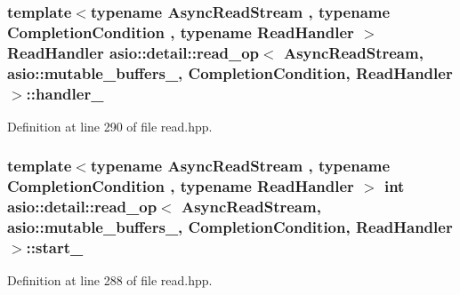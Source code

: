 \subsubsection[{handler\+\_\+}]{\setlength{\rightskip}{0pt plus 5cm}template$<$typename Async\+Read\+Stream , typename Completion\+Condition , typename Read\+Handler $>$ Read\+Handler {\bf asio\+::detail\+::read\+\_\+op}$<$ Async\+Read\+Stream, {\bf asio\+::mutable\+\_\+buffers\+\_},                           Completion\+Condition, Read\+Handler $>$\+::handler\+\_\+}\label{classasio_1_1detail_1_1read__op_3_01_async_read_stream_00_01asio_1_1mutable__buffers__1_00_01_018ff00a3c2aa5481d9cf38a1ea7821a38_ade92732080a200e0a0b16893e6d7c218}


Definition at line 290 of file read.\+hpp.

\hypertarget{classasio_1_1detail_1_1read__op_3_01_async_read_stream_00_01asio_1_1mutable__buffers__1_00_01_018ff00a3c2aa5481d9cf38a1ea7821a38_a77d6cc18b93a59e2513beab2d67fafc3}{}
\subsubsection[{start\+\_\+}]{\setlength{\rightskip}{0pt plus 5cm}template$<$typename Async\+Read\+Stream , typename Completion\+Condition , typename Read\+Handler $>$ int {\bf asio\+::detail\+::read\+\_\+op}$<$ Async\+Read\+Stream, {\bf asio\+::mutable\+\_\+buffers\+\_},                           Completion\+Condition, Read\+Handler $>$\+::start\+\_\+}\label{classasio_1_1detail_1_1read__op_3_01_async_read_stream_00_01asio_1_1mutable__buffers__1_00_01_018ff00a3c2aa5481d9cf38a1ea7821a38_a77d6cc18b93a59e2513beab2d67fafc3}


Definition at line 288 of file read.\+hpp.

